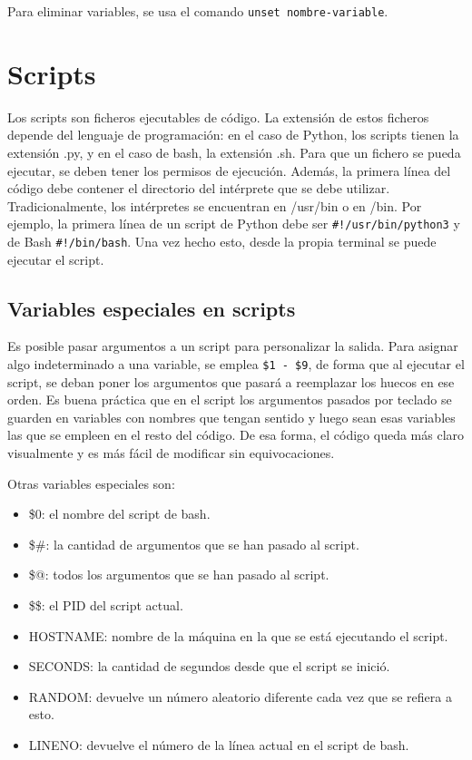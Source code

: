 Para eliminar variables, se usa el comando \texttt{unset nombre-variable}.  \ 

\section{Scripts}
Los scripts son ficheros ejecutables de código. La extensión de estos ficheros depende del lenguaje de programación: en el caso de Python, los scripts tienen la extensión .py, y en el caso de bash, la extensión .sh. Para que un fichero se pueda ejecutar, se deben tener los permisos de ejecución. Además, la primera línea del código debe contener el directorio del intérprete que se debe utilizar. Tradicionalmente, los intérpretes se encuentran en /usr/bin o en /bin. Por ejemplo, la primera línea de un script de Python debe ser \texttt{\#!/usr/bin/python3} y de Bash \texttt{\#!/bin/bash}. Una vez hecho esto, desde la propia terminal se puede ejecutar el script.

\subsection{Variables especiales en scripts}
Es posible pasar argumentos a un script para personalizar la salida. Para asignar algo indeterminado a una variable, se emplea \texttt{\$1 - \$9}, de forma que al ejecutar el script, se deban poner los argumentos que pasará a reemplazar los huecos en ese orden. Es buena práctica que en el script los argumentos pasados por teclado se guarden en variables con nombres que tengan sentido y luego sean esas variables las que se empleen en el resto del código. De esa forma, el código queda más claro visualmente y es más fácil de modificar sin equivocaciones.

Otras variables especiales son: \begin{itemize}
\item \$0: el nombre del script de bash.
\item \$\#: la cantidad de argumentos que se han pasado al script.
\item \$@: todos los argumentos que se han pasado al script.
\item \$\$: el PID del script actual.
\item HOSTNAME: nombre de la máquina en la que se está ejecutando el script. 
\item SECONDS: la cantidad de segundos desde que el script se inició. 
\item RANDOM: devuelve un número aleatorio diferente cada vez que se refiera a esto.
\item LINENO: devuelve el número de la línea actual en el script de bash.
\end{itemize}

